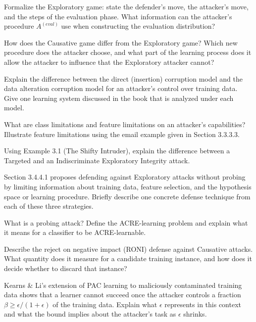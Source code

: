 \documentclass[10pt]{extarticle}
\begin{document}
\begin{questoes}
\item Formalize the Exploratory game: state the defender's move, the attacker's move, and the steps of the evaluation phase. What information can the attacker's procedure $A^{(eval)}$ use when constructing the evaluation distribution?

\item How does the Causative game differ from the Exploratory game? Which new procedure does the attacker choose, and what part of the learning process does it allow the attacker to influence that the Exploratory attacker cannot?

\item Explain the difference between the direct (insertion) corruption model and the data alteration corruption model for an attacker's control over training data. Give one learning system discussed in the book that is analyzed under each model.

\item What are class limitations and feature limitations on an attacker's capabilities? Illustrate feature limitations using the email example given in Section 3.3.3.3.

\item Using Example 3.1 (The Shifty Intruder), explain the difference between a Targeted and an Indiscriminate Exploratory Integrity attack.

\item Section 3.4.4.1 proposes defending against Exploratory attacks without probing by limiting information about training data, feature selection, and the hypothesis space or learning procedure. Briefly describe one concrete defense technique from each of these three strategies.

\item What is a probing attack? Define the ACRE-learning problem and explain what it means for a classifier to be ACRE-learnable.

\item Describe the reject on negative impact (RONI) defense against Causative attacks. What quantity does it measure for a candidate training instance, and how does it decide whether to discard that instance?

\item Kearns \& Li's extension of PAC learning to maliciously contaminated training data shows that a learner cannot succeed once the attacker controls a fraction $\beta \geq \epsilon/(1+\epsilon)$ of the training data. Explain what $\epsilon$ represents in this context and what the bound implies about the attacker's task as $\epsilon$ shrinks.


\end{questoes}
\end{document}
